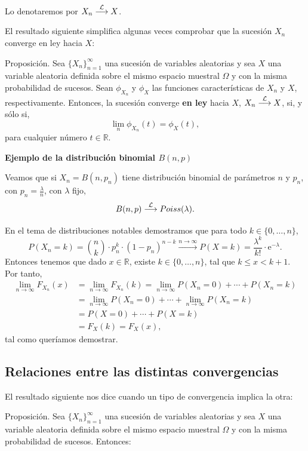 \documentclass[]{book}
\begin{document}
Lo denotaremos por \(X_n\stackrel{{\cal L}}{\longrightarrow}X\).

El resultado siguiente simplifica algunas veces comprobar que la sucesión \(X_n\) converge en ley hacia \(X\):

Proposición.
Sea \(\{X_n\}_{n=1}^\infty\) una sucesión de variables aleatorias y sea \(X\) una variable aleatoria definida sobre el mismo espacio muestral \(\Omega\) y con la misma probabilidad de sucesos. Sean \(\phi_{X_n}\) y \(\phi_X\) las funciones características de \(X_n\) y \(X\), respectivamente. Entonces, la sucesión converge \textbf{en ley} hacia \(X\), \(X_n\stackrel{{\cal L}}{\longrightarrow}X\), si, y sólo si,
\[
\lim_{n} \phi_{X_n}(t) = \phi_X(t),
\]
para cualquier número \(t\in\mathbb{R}\).

\textbf{Ejemplo de la distribución binomial \(B(n,p)\)}

Veamos que si \(X_n=B(n,p_n)\) tiene distribución binomial de parámetros \(n\) y \(p_n\), con \(p_n=\frac{\lambda}{n}\), con \(\lambda\) fijo,
\[
B(n,p)\stackrel{{\cal L}}{\longrightarrow}Poiss(\lambda).
\]

En el tema de distribuciones notables demostramos que para todo \(k\in\{0,\ldots,n\}\),
\[
P(X_n = k)=\binom{n}{k}\cdot p_n^k\cdot (1-p_n)^{n-k}\stackrel{n\to\infty}{\longrightarrow} P(X=k)=\frac{\lambda^k}{k!}\cdot\mathrm{e}^{-\lambda}.
\]
Entonces tenemos que dado \(x\in\mathbb{R}\), existe \(k\in\{0,\ldots,n\}\), tal que \(k\leq x< k+1\). Por tanto,
\[
\begin{array}{rl}
\lim\limits_{n\to\infty} F_{X_n}(x) 
& = \lim\limits_{n\to\infty} F_{X_n}(k)=\lim\limits_{n\to\infty} P(X_n=0)+\cdots + P(X_n=k) \\ 
& =\lim\limits_{n\to\infty} P(X_n=0)+\cdots + \lim\limits_{n\to\infty} P(X_n=k)\\
& = P(X=0)+\cdots + P(X=k)\\ &  =F_X(k)=F_X(x),
\end{array}
\]
tal como queríamos demostrar.

\hypertarget{relaciones-entre-las-distintas-convergencias}{%
\subsection{Relaciones entre las distintas convergencias}\label{relaciones-entre-las-distintas-convergencias}}

El resultado siguiente nos dice cuando un tipo de convergencia implica la otra:

Proposición.
Sea \(\{X_n\}_{n=1}^\infty\) una sucesión de variables aleatorias y sea \(X\) una variable aleatoria definida sobre el mismo espacio muestral \(\Omega\) y con la misma probabilidad de sucesos. Entonces:
\end{document}
